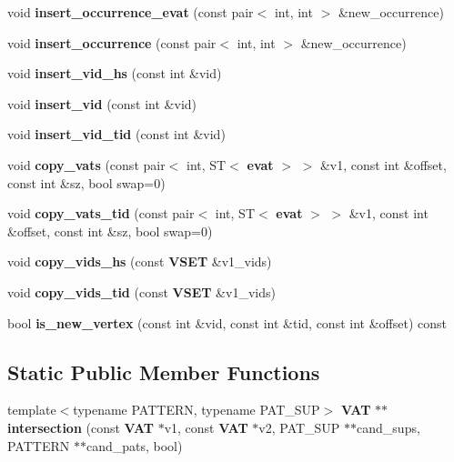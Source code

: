 \begin{CompactItemize}
\item 
void {\bf insert\_\-occurrence\_\-evat} (const  pair$<$ int, int $>$ \&new\_\-occurrence)\label{classvat_3_01GRAPH__PROP_00_01V__Fk1__MINE__PROP_00_01ST_01_4_a12}

\item 
void {\bf insert\_\-occurrence} (const  pair$<$ int, int $>$ \&new\_\-occurrence)\label{classvat_3_01GRAPH__PROP_00_01V__Fk1__MINE__PROP_00_01ST_01_4_a13}

\item 
void {\bf insert\_\-vid\_\-hs} (const  int \&vid)\label{classvat_3_01GRAPH__PROP_00_01V__Fk1__MINE__PROP_00_01ST_01_4_a14}

\item 
void {\bf insert\_\-vid} (const  int \&vid)\label{classvat_3_01GRAPH__PROP_00_01V__Fk1__MINE__PROP_00_01ST_01_4_a15}

\item 
void {\bf insert\_\-vid\_\-tid} (const  int \&vid)\label{classvat_3_01GRAPH__PROP_00_01V__Fk1__MINE__PROP_00_01ST_01_4_a16}

\item 
void {\bf copy\_\-vats} (const  pair$<$ int, ST$<$ {\bf evat} $>$ $>$ \&v1, const  int \&offset, const  int \&sz, bool swap=0)\label{classvat_3_01GRAPH__PROP_00_01V__Fk1__MINE__PROP_00_01ST_01_4_a17}

\item 
void {\bf copy\_\-vats\_\-tid} (const  pair$<$ int, ST$<$ {\bf evat} $>$ $>$ \&v1, const  int \&offset, const  int \&sz, bool swap=0)\label{classvat_3_01GRAPH__PROP_00_01V__Fk1__MINE__PROP_00_01ST_01_4_a18}

\item 
void {\bf copy\_\-vids\_\-hs} (const  {\bf VSET} \&v1\_\-vids)\label{classvat_3_01GRAPH__PROP_00_01V__Fk1__MINE__PROP_00_01ST_01_4_a19}

\item 
void {\bf copy\_\-vids\_\-tid} (const  {\bf VSET} \&v1\_\-vids)\label{classvat_3_01GRAPH__PROP_00_01V__Fk1__MINE__PROP_00_01ST_01_4_a20}

\item 
bool {\bf is\_\-new\_\-vertex} (const  int \&vid, const  int \&tid, const  int \&offset) const 
\end{CompactItemize}
\subsection*{Static Public Member Functions}
\begin{CompactItemize}
\item 
template$<$typename PATTERN, typename PAT\_\-SUP$>$ {\bf VAT} $\ast$$\ast$ {\bf intersection} (const  {\bf VAT} $\ast$v1, const  {\bf VAT} $\ast$v2, PAT\_\-SUP $\ast$$\ast$cand\_\-sups, PATTERN $\ast$$\ast$cand\_\-pats, bool)
\end{CompactItemize}
